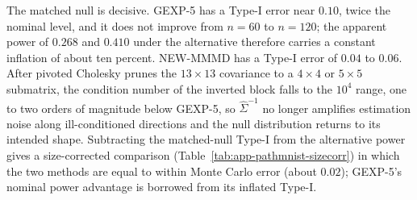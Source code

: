 \documentclass[12pt]{article}
\begin{document}
\begin{table}[H]
\centering
\caption{PathMNIST raw-pixel two-sample test. For NEW-MMMD, condition numbers are for the $q\times q$ submatrix actually inverted. The ridge is $\lambda=10^{-5}\cdot\min_i\widehat{\Sigma}_{ii}$ (median $\lambda\approx 2\times 10^{-7}$).}
\label{tab:app-pathmnist}
\scriptsize
\setlength{\tabcolsep}{4.5pt}
\end{table}

The matched null is decisive. GEXP-5 has a Type-I error near $0.10$, twice the nominal level, and it does not improve from $n=60$ to $n=120$; the apparent power of $0.268$ and $0.410$ under the alternative therefore carries a constant inflation of about ten percent. NEW-MMMD has a Type-I error of $0.04$ to $0.06$. After pivoted Cholesky prunes the $13\times 13$ covariance to a $4\times 4$ or $5\times 5$ submatrix, the condition number of the inverted block falls to the $10^{4}$ range, one to two orders of magnitude below GEXP-5, so $\widehat{\Sigma}^{-1}$ no longer amplifies estimation noise along ill-conditioned directions and the null distribution returns to its intended shape. Subtracting the matched-null Type-I from the alternative power gives a size-corrected comparison (Table~\ref{tab:app-pathmnist-sizecorr}) in which the two methods are equal to within Monte Carlo error (about $0.02$); GEXP-5's nominal power advantage is borrowed from its inflated Type-I.
\end{document}

